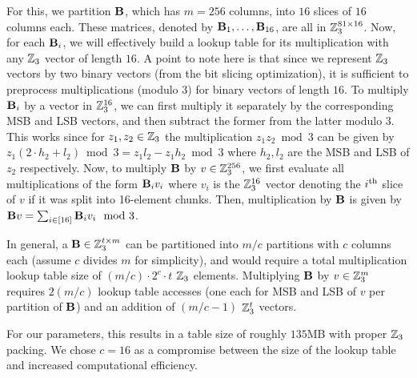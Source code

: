 For this, we partition $\mat{B}$, which has $m=256$ columns, into $16$ slices of $16$ columns each. These matrices, denoted by $\mat{B}_1,\dots, \mat{B}_{16}$, are all in $\mathbb{Z}_3^{81 \times 16}$. Now, for each $\mat{B}_i$, we will effectively build a lookup table for its multiplication with any $\mathbb{Z}_3$ vector of length $16$. A point to note here is that since we  represent $\mathbb{Z}_3$ vectors by two binary vectors (from the bit slicing optimization), it is sufficient to preprocess multiplications (modulo 3) for binary vectors of length $16$. To multiply $\mat{B}_{i}$ by a vector in $\mathbb{Z}_3^{16}$, we can first multiply it separately by the corresponding MSB and LSB vectors, and then subtract the former from the latter modulo 3. This works since for $z_1, z_2 \in \mathbb{Z}_3$ the multiplication $z_1z_2 \bmod 3$ can be given by $z_1(2\cdot h_2 + l_2) \bmod 3 = z_1l_2 - z_1h_2 \bmod 3$ where $h_2, l_2$ are the MSB and LSB of $z_2$ respectively. Now, to multiply $\mat{B}$ by $v \in \mathbb{Z}_3^{256}$, we first evaluate all multiplications of the form $\mat{B}_iv_i$ where $v_i$ is the $\mathbb{Z}_3^{16}$ vector denoting the $i^{\textnormal{th}}$ slice of $v$ if it was split into 16-element chunks. Then, multiplication by $\mat{B}$ is given by $\mat{B}v = \sum_{i \in [16]} \mat{B}_i v_i \mod 3$.

In general, a $\mat{B} \in \Z_3^{t \times m}$ can be partitioned into $m/c$ partitions with $c$ columns each (assume $c$ divides $m$ for simplicity), and would require a total multiplication lookup table size of $(m/c) \cdot 2^c \cdot t$ $\mathbb{Z}_3$ elements. Multiplying $\mat{B}$ by $v \in \mathbb{Z}_3^{m}$ requires $2(m/c)$ lookup table accesses (one each for MSB and LSB of $v$ per partition of $\mat{B}$) and an addition of $(m/c - 1)$ $\mathbb{Z}_3^{t}$ vectors.


For our parameters, this results in a table size of roughly $135$MB with proper $\mathbb{Z}_3$ packing. We chose $c = 16$ as a compromise between the size of the lookup table and increased computational efficiency.












